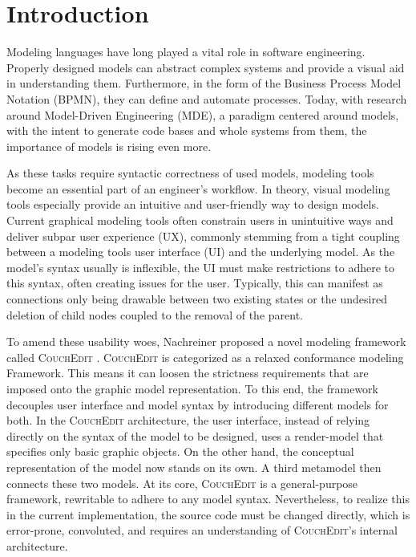 \chapter{Introduction}
\label{ch:introduction}


Modeling languages have long played a vital role in software engineering. Properly designed models can abstract complex systems and provide a visual aid in understanding them. Furthermore, in the form of the Business Process Model Notation (BPMN), they can define and automate processes. Today, with research around Model-Driven Engineering (MDE), a paradigm centered around models, with the intent to generate code bases and whole systems from them, the importance of models is rising even more.

As these tasks require syntactic correctness of used models, modeling tools become an essential part of an engineer's workflow. In theory, visual modeling tools especially provide an intuitive and user-friendly way to design models. Current graphical modeling tools often constrain users in unintuitive ways and deliver subpar user experience (UX), commonly stemming from a tight coupling between a modeling tools user interface (UI) and the underlying model. As the model's syntax usually is inflexible, the UI must make restrictions to adhere to this syntax, often creating issues for the user. Typically, this can manifest as connections only being drawable between two existing states or the undesired deletion of child nodes coupled to the removal of the parent.

To amend these usability woes, Nachreiner proposed a novel modeling framework called \textsc{CouchEdit} \cite{nachreiner_couchedit_2020}. \textsc{CouchEdit} is categorized as a relaxed conformance modeling Framework. This means it can loosen the strictness requirements that are imposed onto the graphic model representation. To this end, the framework decouples user interface and model syntax by introducing different models for both. In the \textsc{CouchEdit} architecture, the user interface, instead of relying directly on the syntax of the model to be designed, uses a render-model that specifies only basic graphic objects. On the other hand, the conceptual representation of the model now stands on its own. A third metamodel then connects these two models. At its core, \textsc{CouchEdit} is a general-purpose framework, rewritable to adhere to any model syntax. Nevertheless, to realize this in the current implementation, the source code must be changed directly, which is error-prone, convoluted, and requires an understanding of \textsc{CouchEdit}'s internal architecture.

